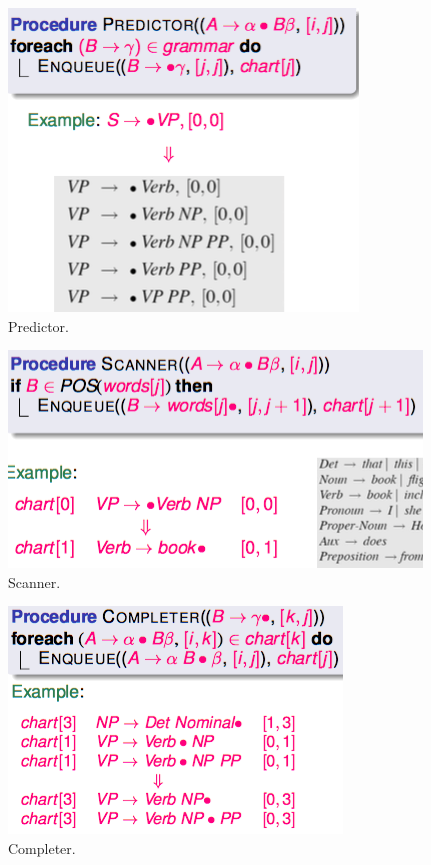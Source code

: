 \begin{figure}[htp]
	\centering
	\includegraphics[scale=0.5]{images/51_predictor.png}
 	\caption{Predictor.}
\end{figure}

\begin{figure}[htp]
	\centering
	\includegraphics[scale=0.5]{images/52_scanner.png}
 	\caption{Scanner.}
\end{figure}

\begin{figure}[htp]
	\centering
	\includegraphics[scale=0.5]{images/53_completer.png}
 	\caption{Completer.}
\end{figure}

